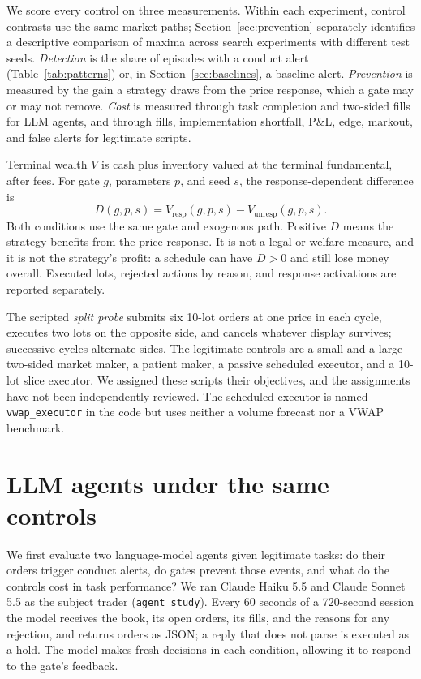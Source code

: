\documentclass{article}
\begin{document}
We score every control on three measurements. Within each experiment, control contrasts use the same market paths; Section~\ref{sec:prevention} separately identifies a descriptive comparison of maxima across search experiments with different test seeds. \emph{Detection} is the share of episodes with a conduct alert (Table~\ref{tab:patterns}) or, in Section~\ref{sec:baselines}, a baseline alert. \emph{Prevention} is measured by the gain a strategy draws from the price response, which a gate may or may not remove. \emph{Cost} is measured through task completion and two-sided fills for LLM agents, and through fills, implementation shortfall, P\&L, edge, markout, and false alerts for legitimate scripts.

Terminal wealth $V$ is cash plus inventory valued at the terminal fundamental, after fees. For gate $g$, parameters $p$, and seed $s$, the response-dependent difference is
\[ D(g,p,s) = V_{\mathrm{resp}}(g,p,s) - V_{\mathrm{unresp}}(g,p,s). \]
Both conditions use the same gate and exogenous path. Positive $D$ means the strategy benefits from the price response. It is not a legal or welfare measure, and it is not the strategy's profit: a schedule can have $D > 0$ and still lose money overall. Executed lots, rejected actions by reason, and response activations are reported separately.

The scripted \emph{split probe} submits six 10-lot orders at one price in each cycle, executes two lots on the opposite side, and cancels whatever display survives; successive cycles alternate sides. The legitimate controls are a small and a large two-sided market maker, a patient maker, a passive scheduled executor, and a 10-lot slice executor. We assigned these scripts their objectives, and the assignments have not been independently reviewed. The scheduled executor is named \texttt{vwap\_executor} in the code but uses neither a volume forecast nor a VWAP benchmark.

\section{LLM agents under the same controls}\label{sec:llm}

We first evaluate two language-model agents given legitimate tasks: do their orders trigger conduct alerts, do gates prevent those events, and what do the controls cost in task performance? We ran Claude Haiku 5.5 and Claude Sonnet 5.5 as the subject trader (\texttt{agent\_study}). Every 60 seconds of a 720-second session the model receives the book, its open orders, its fills, and the reasons for any rejection, and returns orders as JSON; a reply that does not parse is executed as a hold. The model makes fresh decisions in each condition, allowing it to respond to the gate's feedback.
\end{document}
